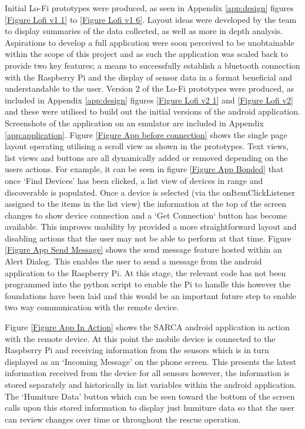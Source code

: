 \documentclass{ueacmpstyle}
\begin{document}
        Initial Lo-Fi prototypes were produced, as seen in Appendix \ref{app:design} figures \ref{Figure Lofi v1 1} to \ref{Figure Lofi v1 6}.  Layout ideas were developed by the team to display summaries of the data collected, as well as more in depth analysis.  Aspirations to develop a full application were soon perceived to be unobtainable within the scope of this project and as such the application was scaled back to provide two key features; a means to successfully establish a bluetooth connection with the Raspberry Pi and the display of sensor data in a format beneficial and understandable to the user.  Version 2 of the Lo-Fi prototypes were produced, as included in Appendix \ref{app:design} figures \ref{Figure Lofi v2 1} and \ref{Figure Lofi v2} and these were utilised to build out the initial versions of the android application.  Screenshots of the application on an emulator are included in Appendix \ref{app:application}.  Figure \ref{Figure App before connection} shows the single page layout operating utilising a scroll view as shown in the prototypes.  Text views, list views and buttons are all dynamically added or removed depending on the users actions.  For example, it can be seen in figure \ref{Figure App Bonded} that once `Find Devices' has been clicked, a list view of devices in range and discoverable is populated.  Once a device is selected (via the onItemClickListener assigned to the items in the list view) the information at the top of the screen changes to show device connection and a `Get Connection` button has become available.  This improves usability by provided a more straightforward layout and disabling actions that the user may not be able to perform at that time.  Figure \ref{Figure App Send Message} shows the send message feature hosted within an Alert Dialog.  This enables the user to send a message from the android application to the Raspberry Pi.  At this stage, the relevant code has not been programmed into the python script to enable the Pi to handle this however the foundations have been laid and this would be an important future step to enable two way communication with the remote device.  
        
        Figure \ref{Figure App In Action} shows the SARCA android application in action with the remote device.  At this point the mobile device is connected to the Raspberry Pi and receiving information from the sensors which is in turn displayed as an `Incoming Message' on the phone screen.  This presents the latest information received from the device for all sensors however, the information is stored separately and historically in list variables within the android application.  The `Humiture Data' button which can be seen toward the bottom of the screen calls upon this stored information to display just humiture data so that the user can review changes over time or throughout the rescue operation. 
    
\end{document}
